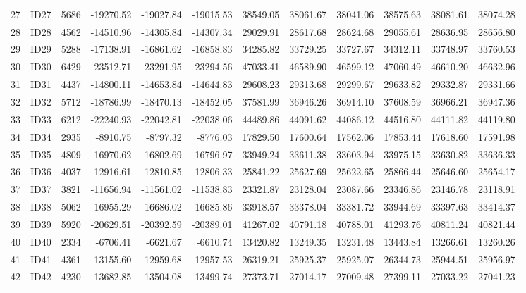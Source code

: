 \documentclass[12pt]{article}\usepackage[]{graphicx}\usepackage[]{color}
\begin{document}
\begin{table}[ht]
{\begin{tabular}{rlrrrrrrrrrr}
  27 & ID27 & 5686 & -19270.52 & -19027.84 & -19015.53 & 38549.05 & 38061.67 & 38041.06 & 38575.63 & 38081.61 & 38074.28 \\ 
  28 & ID28 & 4562 & -14510.96 & -14305.84 & -14307.34 & 29029.91 & 28617.68 & 28624.68 & 29055.61 & 28636.95 & 28656.80 \\ 
  29 & ID29 & 5288 & -17138.91 & -16861.62 & -16858.83 & 34285.82 & 33729.25 & 33727.67 & 34312.11 & 33748.97 & 33760.53 \\ 
  30 & ID30 & 6429 & -23512.71 & -23291.95 & -23294.56 & 47033.41 & 46589.90 & 46599.12 & 47060.49 & 46610.20 & 46632.96 \\ 
  31 & ID31 & 4437 & -14800.11 & -14653.84 & -14644.83 & 29608.23 & 29313.68 & 29299.67 & 29633.82 & 29332.87 & 29331.66 \\ 
  32 & ID32 & 5712 & -18786.99 & -18470.13 & -18452.05 & 37581.99 & 36946.26 & 36914.10 & 37608.59 & 36966.21 & 36947.36 \\ 
  33 & ID33 & 6212 & -22240.93 & -22042.81 & -22038.06 & 44489.86 & 44091.62 & 44086.12 & 44516.80 & 44111.82 & 44119.80 \\ 
  34 & ID34 & 2935 & -8910.75 & -8797.32 & -8776.03 & 17829.50 & 17600.64 & 17562.06 & 17853.44 & 17618.60 & 17591.98 \\ 
  35 & ID35 & 4809 & -16970.62 & -16802.69 & -16796.97 & 33949.24 & 33611.38 & 33603.94 & 33975.15 & 33630.82 & 33636.33 \\ 
  36 & ID36 & 4037 & -12916.61 & -12810.85 & -12806.33 & 25841.22 & 25627.69 & 25622.65 & 25866.44 & 25646.60 & 25654.17 \\ 
  37 & ID37 & 3821 & -11656.94 & -11561.02 & -11538.83 & 23321.87 & 23128.04 & 23087.66 & 23346.86 & 23146.78 & 23118.91 \\ 
  38 & ID38 & 5062 & -16955.29 & -16686.02 & -16685.86 & 33918.57 & 33378.04 & 33381.72 & 33944.69 & 33397.63 & 33414.37 \\ 
  39 & ID39 & 5920 & -20629.51 & -20392.59 & -20389.01 & 41267.02 & 40791.18 & 40788.01 & 41293.76 & 40811.24 & 40821.44 \\ 
  40 & ID40 & 2334 & -6706.41 & -6621.67 & -6610.74 & 13420.82 & 13249.35 & 13231.48 & 13443.84 & 13266.61 & 13260.26 \\ 
  41 & ID41 & 4361 & -13155.60 & -12959.68 & -12957.53 & 26319.21 & 25925.37 & 25925.07 & 26344.73 & 25944.51 & 25956.97 \\ 
  42 & ID42 & 4230 & -13682.85 & -13504.08 & -13499.74 & 27373.71 & 27014.17 & 27009.48 & 27399.11 & 27033.22 & 27041.23 \\ 

\end{tabular}}
\end{table}
\end{document}
